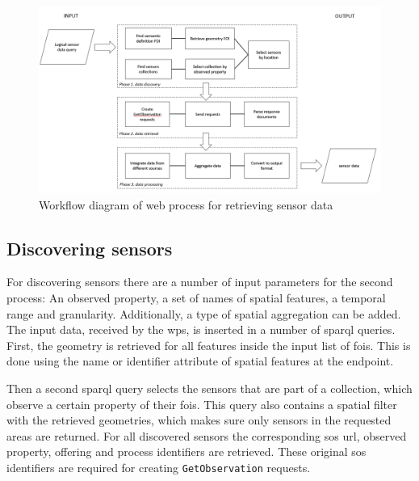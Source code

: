 \begin{figure}
	\centering
	\includegraphics[width=1\linewidth]{UML/wps2workflow.png}
	\caption{Workflow diagram of web process for retrieving sensor data}
	\label{fig:WPS2workflow}
\end{figure}

\subsection{Discovering sensors}
\label{par:discover}
For discovering sensors there are a number of input parameters for the second process: An observed property, a set of names of spatial features, a temporal range and granularity. Additionally, a type of spatial aggregation can be added. The input data, received by the \ac{wps}, is inserted in a number of \ac{sparql} queries. First, the geometry is retrieved for all features inside the input list of \acp{foi}. This is done using the name or identifier attribute of spatial features at the endpoint.  

Then a second \ac{sparql} query selects the sensors that are part of a collection, which observe a certain property of their \acp{foi}. This query also contains a spatial filter with the retrieved geometries, which makes sure only sensors in the requested areas are returned. For all discovered sensors the corresponding \ac{sos} \ac{url}, observed property, offering and process identifiers are retrieved. These original \ac{sos} identifiers are required for creating \texttt{GetObservation} requests.  

